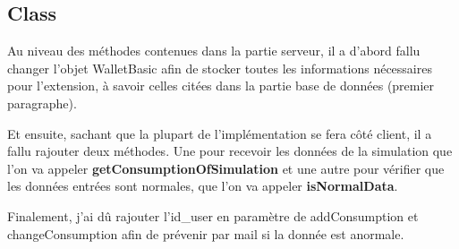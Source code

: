 \subsection{Class}

\begin{flushleft}
Au niveau des méthodes contenues dans la partie serveur, il a d'abord fallu changer l'objet WalletBasic afin de stocker toutes les informations nécessaires pour l'extension, à savoir celles citées dans la partie base de données (premier paragraphe).
\end{flushleft}

\begin{flushleft}
Et ensuite, sachant que la plupart de l'implémentation se fera côté client, il a fallu rajouter deux méthodes. Une pour recevoir les données de la simulation que l'on va appeler \textbf{getConsumptionOfSimulation} et une autre pour vérifier que les données entrées sont normales, que l'on va appeler \textbf{isNormalData}.
\end{flushleft}

\begin{flushleft}
Finalement, j'ai dû rajouter l'id_user en paramètre de addConsumption et changeConsumption afin de prévenir par mail si la donnée est anormale.
\end{flushleft}


